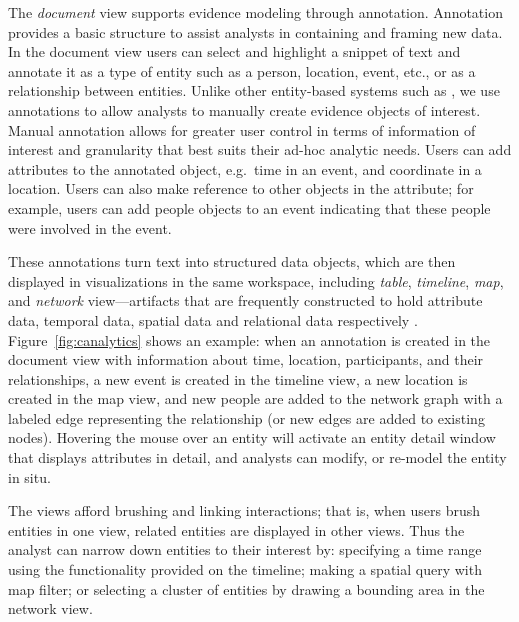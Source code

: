 The \emph{document} view supports evidence modeling through annotation. Annotation provides a basic structure to assist analysts in containing and framing new data. In the
document view users can select and highlight a snippet of text and
annotate it as a type of entity such as a person, location, event, etc.,
or as a relationship between entities. Unlike other entity-based
systems such as \cite{Bier2010,Stasko2008}, we use annotations to
allow analysts to manually create evidence objects of interest. Manual
annotation allows for greater user control in terms of
information of interest and granularity that best suits their ad-hoc
analytic needs.
Users can add attributes to the annotated object, e.g.~time in an event, and coordinate in a location. Users can
also make reference to other objects in the attribute; for example,
users can add people objects to an event indicating that these people
were involved in the event.

These annotations turn text into structured data objects, which are then displayed in visualizations in the same workspace, including \emph{table}, \emph{timeline}, \emph{map},
and \emph{network} view---artifacts that are frequently constructed to hold attribute
data, temporal data, spatial data and relational data respectively
\cite{Carroll2013}. Figure~\ref{fig:canalytics} shows an example:
when an annotation is created in the document view with information
about time, location, participants, and their relationships, a new event
is created in the timeline view, a new location is created in the map
view, and new people are added to the network graph with a labeled edge
representing the relationship (or new edges are added to existing
nodes). Hovering the mouse over an entity will activate an entity detail
window that displays attributes in detail, and analysts can modify, or
re-model the entity in situ.

The views afford brushing and linking interactions;
that is, when users brush entities in one view, related
entities are displayed in other views. Thus the analyst can narrow down
entities to their interest by: specifying a time range using the functionality provided on the timeline; making a spatial query
with map filter; or selecting a cluster of entities by drawing a bounding
area in the network view.


